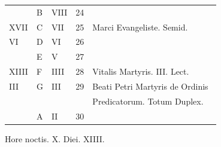 \begin{center}
\begin{tabular}{l | l | l | r | l l}
\color{Red}  & B & \color{Red} VIII & 24 & & \color{Red} \\
\color{Red} XVII & C & \color{Red} VII & 25 & \color{Red} Marci Evangeliste. Semid. \\
\color{Red} VI & D & \color{Red} VI & 26 & & \color{Red} \\
\color{Red}  & E & \color{Red} V & 27 & & \color{Red} \\
\color{Red} XIIII & F & \color{Red} IIII & 28 & Vitalis Martyris. III. Lect. & \color{Red} \\
\color{Red} III & G & \color{Red} III & 29 & \multicolumn{2}{l}{Beati Petri Martyris de Ordinis } \\
 & & & & \quad Predicatorum. Totum Duplex. \\
\color{Red}  & \color{Red} A & \color{Red} II & 30 & & \color{Red} \\
\end{tabular}
\newline \color{Red} Hore noctis. X. Diei. XIIII.
\end{center}



\newpage
\color{Red}\color{black}

